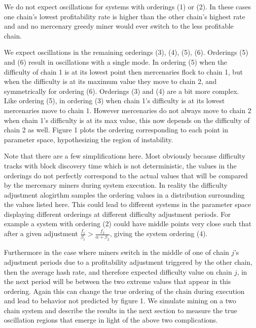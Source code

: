\documentclass[10pt, preprint]{aastex}
\begin{document}
We do not expect oscillations for systems with orderings (1) or (2).  In these cases one chain's lowest profitability rate is higher than the other chain's highest rate and and no mercenary greedy miner would ever switch to the less profitable chain.  

We expect oscillations in the remaining orderings (3), (4), (5), (6).  Orderings (5) and (6) result in oscillations with a single mode.  In ordering (5) when the difficulty of chain 1 is at its lowest point then mercenaries flock to chain 1, but when the difficulty is at its maximum value they move to chain 2, and symmetrically for ordering (6).  Orderings (3) and (4) are a bit more complex.  Like ordering (5), in ordering (3) when chain 1's difficulty is at its lowest mercenaries move to chain 1.  However mercenaries do not always move to chain 2 when chain 1's difficulty is at its max value, this now depends on the difficulty of chain 2 as well.  Figure 1 plots the ordering corresponding to each point in parameter space, hypothesizing the region of instability. 

Note that there are a few simplifications here.  Most obviously because difficulty tracks with block discovery time which is not deterministic, the values in the orderings do not perfectly correspond to the actual values that will be compared by the mercenary miners during system execution.  In reality the difficulty adjustment alogirthm samples the ordering values in a distribution surrounding the values listed here.  This could lead to different systems in the parameter space displaying different orderings at different difficulty adjustment periods.  For example a system with ordering (2) could have middle points very close such that after a given adjustment $\frac{f_1}{\beta_1} >\frac{f_2}{\alpha + \beta_2}$, giving the system ordering (4).

Furthermore in the case where miners switch in the middle of one of chain $j$'s adjustment periods due to a profitability adjustment triggered by the other chain, then the average hash rate, and therefore expected difficulty value on chain $j$, in the next period will be between the two extreme values that appear in this ordering.  Again this can change the true ordering of the chain during execution and lead to behavior not predicted by figure 1.  We simulate mining on a two chain system and describe the results in the next section to measure the true oscillation regions that emerge in light of the above two complications.
\end{document}
